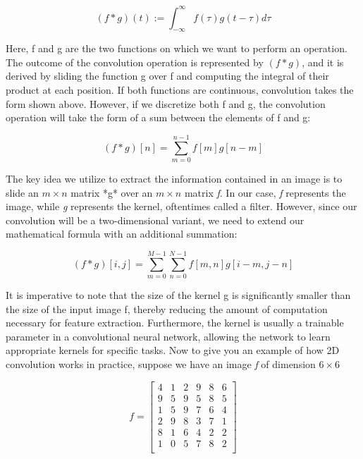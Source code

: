 \documentclass[onecolumn,10pt,cleanfoot]{asme2ej}
\begin{document}
\begin{equation}
(f \ast g)(t) := \int_{-\infty}^{\infty} f(\tau) g(t-\tau) d \tau
\end{equation}

Here, f and g are the two functions on which we want to perform an operation. The outcome of the convolution operation is represented by $(f \ast g)$, and it is derived by sliding the function g over f and computing the integral of their product at each position. If both functions are continuous, convolution takes the form shown above. However, if we discretize both f and g, the convolution operation will take the form of a sum between the elements of f and g:

\begin{equation}
(f \ast g)[n] = \sum_{m=0}^{n-1} f[m] g[n-m]
\end{equation}

The key idea we utilize to extract the information contained in an image is to slide an $m \times n$ matrix *g* over an $m \times n$ matrix \textit{f}. In our case, \textit{f} represents the image, while \textit{g} represents the kernel, oftentimes called a filter. However, since our convolution will be a two-dimensional variant, we need to extend our mathematical formula with an additional summation:

\begin{equation}
(f \ast g)[i, j] = \sum_{m=0}^{M-1} \sum_{n=0}^{N-1} f[m,n] g[i-m, j-n]
\end{equation}

It is imperative to note that the size of the kernel g is significantly smaller than the size of the input image f, thereby reducing the amount of computation necessary for feature extraction. Furthermore, the kernel is usually a trainable parameter in a convolutional neural network, allowing the network to learn appropriate kernels for specific tasks. Now to give you an example of how 2D convolution works in practice, suppose we have an image \textit{f} of dimension $6 \times 6$

\begin{equation}
f = \begin{bmatrix}
4 & 1 & 2 & 9 & 8 & 6 \\
9 & 5 & 9 & 5 & 8 & 5 \\
1 & 5 & 9 & 7 & 6 & 4 \\
2 & 9 & 8 & 3 & 7 & 1 \\
8 & 1 & 6 & 4 & 2 & 2 \\
1 & 0 & 5 & 7 & 8 & 2 \\
\end{bmatrix}
\end{equation}
\end{document}
